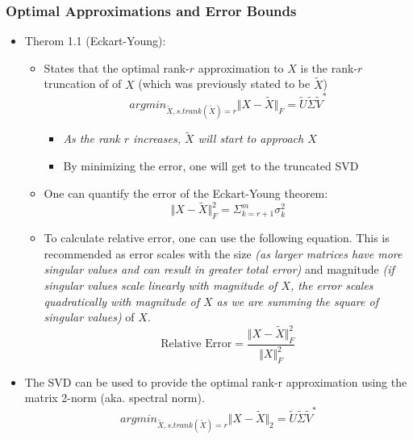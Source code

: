 \documentclass[11.5pt,a4paper]{article}
\begin{document}
\subsubsection*{Optimal Approximations and Error Bounds}

\begin{itemize}
    \item Therom 1.1 (Eckart-Young):
    \begin{itemize}
        \item States that the optimal rank-$r$ approximation to $X$ is the rank-$r$ truncation of of $X$ (which was previously stated to be $\tilde{X}$)
        \begin{equation*}
            argmin_{\tilde{X}, s.t rank(\tilde{X})=r} \Vert X - \tilde{X} \Vert_F = \tilde{U}\tilde{\Sigma}\tilde{V}^*
        \end{equation*}
        \begin{itemize}
            \item \textit{As the rank $r$ increases, $\tilde{X}$ will start to approach $X$}
            \item By minimizing the error, one will get to the truncated SVD
        \end{itemize}
        \item One can quantify the error of the Eckart-Young theorem:
        \begin{equation*}
            \Vert X - \tilde{X} \Vert^2_F = \Sigma^m_{k=r+1} \sigma^2_k 
        \end{equation*}
        \item To calculate relative error, one can use the following equation. This is recommended as error scales with the size \textit{(as larger matrices have more singular values and can result in greater total error)} and magnitude \textit{(if singular values scale linearly with magnitude of $X$, the error scales quadratically with magnitude of $X$ as we are summing the square of singular values)} of $X$.
        \begin{equation*}
            \text{Relative Error} = \frac{\Vert X - \tilde{X} \Vert^2_F}{\Vert X \Vert^2_F}
        \end{equation*}
    \end{itemize}
    \item The SVD can be used to provide the optimal rank-r approximation using the matrix 2-norm (aka. spectral norm).
    \begin{equation*}
        argmin_{\tilde{X}, s.t rank(\tilde{X})=r} \Vert X - \tilde{X} \Vert_2 = \tilde{U}\tilde{\Sigma}\tilde{V}^*

\end{equation*}
\end{itemize}
\end{document}
